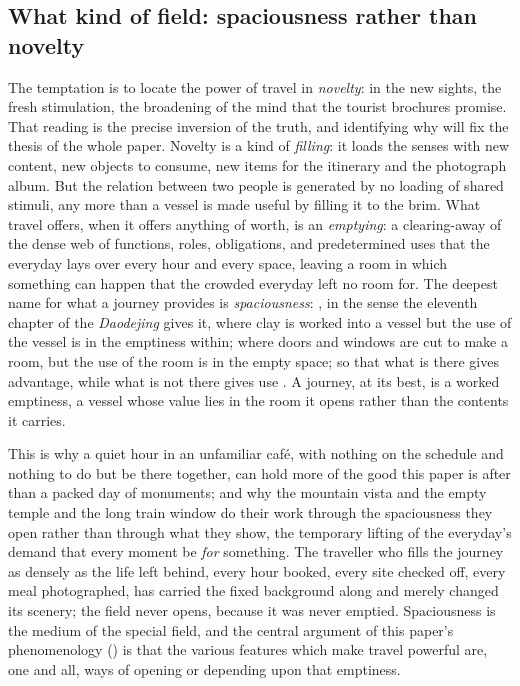 \subsection{What kind of field: spaciousness rather than novelty}
\label{p21:sub:intro-spaciousness}

The temptation is to locate the power of travel in \emph{novelty}: in the new sights, the fresh stimulation, the broadening of the mind that the tourist brochures promise. That reading is the precise inversion of the truth, and identifying why will fix the thesis of the whole paper. Novelty is a kind of \emph{filling}: it loads the senses with new content, new objects to consume, new items for the itinerary and the photograph album. But the relation between two people is generated by no loading of shared stimuli, any more than a vessel is made useful by filling it to the brim. What travel offers, when it offers anything of worth, is an \emph{emptying}: a clearing-away of the dense web of functions, roles, obligations, and predetermined uses that the everyday lays over every hour and every space, leaving a room in which something can happen that the crowded everyday left no room for. The deepest name for what a journey provides is \emph{spaciousness}: , in the sense the eleventh chapter of the \emph{Daodejing} gives it, where clay is worked into a vessel but the use of the vessel is in the emptiness within; where doors and windows are cut to make a room, but the use of the room is in the empty space; so that what is there gives advantage, while what is not there gives use \parencite{laozi1963}. A journey, at its best, is a worked emptiness, a vessel whose value lies in the room it opens rather than the contents it carries.

This is why a quiet hour in an unfamiliar café, with nothing on the schedule and nothing to do but be there together, can hold more of the good this paper is after than a packed day of monuments; and why the mountain vista and the empty temple and the long train window do their work through the spaciousness they open rather than through what they show, the temporary lifting of the everyday's demand that every moment be \emph{for} something. The traveller who fills the journey as densely as the life left behind, every hour booked, every site checked off, every meal photographed, has carried the fixed background along and merely changed its scenery; the field never opens, because it was never emptied. Spaciousness is the medium of the special field, and the central argument of this paper's phenomenology () is that the various features which make travel powerful are, one and all, ways of opening or depending upon that emptiness.


